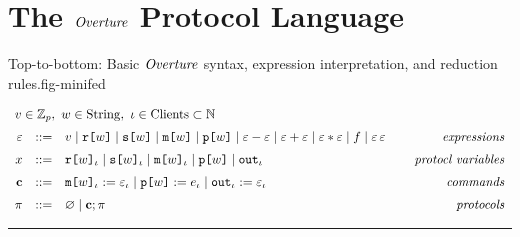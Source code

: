 \section{The $\mathit{Overture}$ Protocol Language}
\label{section-lang}

\begin{fpfig}[t]{Top-to-bottom: Basic $\mathit{Overture}$ syntax, expression interpretation, and reduction rules.}{fig-minifed}
  {
    $$
    \begin{array}{rcl@{\hspace{8mm}}r}
      \multicolumn{4}{l}{v \in \mathbb{Z}_p,\ w \in \mathrm{String},\ \cid \in \mathrm{Clients} \subset  \mathbb{N} }\\[2mm] %
      \be &::=& v \mid \flip{w} \mid \secret{w} \mid \mesg{w} \mid \rvl{w} \mid \be \fminus \be \mid \be \fplus \be \mid \be \ftimes \be \mid f \mid \be\,\be & \textit{expressions}\\[2mm]
      x &::=& \elab{\flip{w}}{\cid} \mid \elab{\secret{w}}{\cid} \mid \elab{\mesg{w}}{\cid} \mid \rvl{w} \mid \out{\cid} & \textit{protocl variables} \\[2mm]
      \instr &::=& \eassign{\mesg{w}}{\cid}{\be}{\cid} \mid
      \reveal{w}{e}{\cid} \mid \pubout{\cid}{\be}{\cid} & \textit{commands} \\[2mm]
      \prog &::=& \varnothing \mid \instr; \prog & \textit{protocols}
    \end{array}
    $$
  
  \rule{130mm}{0.5pt}

}
\end{fpfig}
